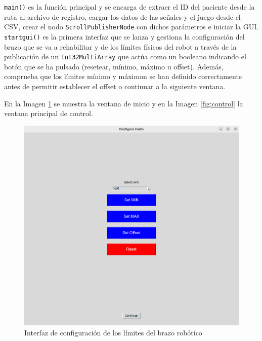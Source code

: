 \verb|main()| es la función principal y se encarga de extraer el ID del paciente desde la ruta al archivo de registro, cargar los datos de las señales y el juego desde el CSV, crear el nodo \verb|ScrollPublisherNode| con dichos parámetros e iniciar la GUI.
\verb|startgui()| es la primera interfaz que se lanza y gestiona la configuración del brazo que se va a rehabilitar y de los límites físicos del robot a través de la publicación de un \verb|Int32MultiArray| que actúa como un booleano indicando el botón que se ha pulsado (resetear, mínimo, máximo u offset).
Además, comprueba que los límites mínimo y máximon se han definido correctamente antes de permitir establecer el offset o continuar a la siguiente ventana.

En la Imagen \ref{fig:config} se muestra la ventana de inicio y en la Imagen \ref{fig:control} la ventana principal de control.

\begin{figure}[ht!]
	\centering
	\begin{minipage}{0.85\linewidth}
		\centering
		\includegraphics[width=\linewidth]{figs/config_limits.png}
	\end{minipage}
	\caption[Interfaz de configuración de los límites del brazo robótico]{Interfaz de configuración de los límites del brazo robótico}
	\label{fig:config}
\end{figure}

